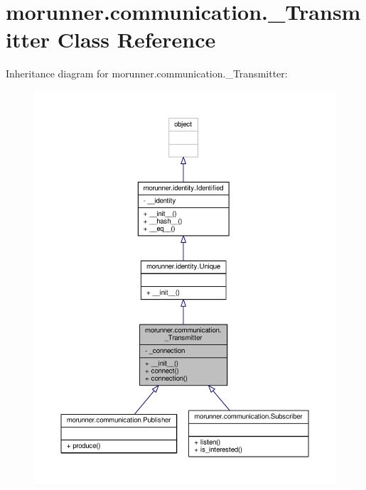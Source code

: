 \hypertarget{classmorunner_1_1communication_1_1__Transmitter}{}\section{morunner.\+communication.\+\_\+\+Transmitter Class Reference}
\label{classmorunner_1_1communication_1_1__Transmitter}


Inheritance diagram for morunner.\+communication.\+\_\+\+Transmitter\+:
\nopagebreak
\begin{figure}[H]
\begin{center}
\leavevmode
\includegraphics[width=350pt]{classmorunner_1_1communication_1_1__Transmitter__inherit__graph}
\end{center}
\end{figure}


